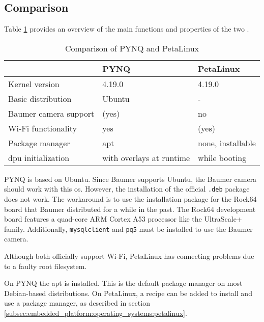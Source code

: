 \subsection{Comparison}
\label{subsec:embedded_platform:operating_systems:comparison}

Table \ref{tab:compare_os} provides an overview of the main functions and properties of the two .

\begin{table}
  \caption{Comparison of PYNQ and PetaLinux}
  \label{tab:compare_os}
  \centering
  \begin{tabular}{lll}
    \toprule
     & \textbf{PYNQ} & \textbf{PetaLinux} \\
    \midrule
    Kernel version & 4.19.0 & 4.19.0 \\
    Basic distribution & Ubuntu \cite{pynq_presentation} & - \\
    Baumer camera support & (yes) \cite{baumer_prog_guide} & no \\
    Wi-Fi functionality & yes & (yes) \\
    Package manager & \acrshort{apt} & none, installable \\
    \acrshort{dpu} initialization & with overlays at runtime \cite{pynq_overlays} & while booting \cite{petalinux_user_guide} \\
    \bottomrule
  \end{tabular}
\end{table}

PYNQ is based on Ubuntu.
Since Baumer supports Ubuntu, the Baumer camera should work with this \acrlong{os}.
However, the installation of the official \texttt{.deb} package does not work.
The workaround is to use the installation package for the Rock64 board that Baumer distributed for a while in the past.
The Rock64 development board features a quad-core ARM Cortex A53 processor like the UltraScale+ family.
Additionally, \texttt{mysqlclient} and \texttt{pq5} must be installed to use the Baumer camera.

Although both  officially support Wi-Fi, PetaLinux has connecting problems due to a faulty root filesystem.

On PYNQ the \acrfull{apt} is installed.
This is the default package manager on most Debian-based distributions.
On PetaLinux, a recipe can be added to install and use a package manager, as described in section \ref{subsec:embedded_platform:operating_systems:petalinux}.
